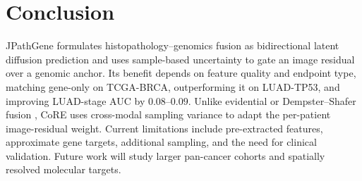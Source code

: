 \FloatBarrier
\section{Conclusion}
\label{sec:conclusion}

JPathGene formulates histopathology--genomics fusion as bidirectional latent
diffusion prediction and uses sample-based uncertainty to gate an image residual
over a genomic anchor. Its benefit depends on feature quality and endpoint type,
matching gene-only on TCGA-BRCA, outperforming it on LUAD-TP53, and improving
LUAD-stage AUC by $0.08$--$0.09$. Unlike evidential or Dempster--Shafer fusion
\cite{sensoy2018evidential,han2021trusted}, CoRE uses cross-modal sampling
variance to adapt the per-patient image-residual weight. Current limitations include pre-extracted features, approximate gene
targets, additional sampling, and the need for clinical validation. Future work
will study larger pan-cancer cohorts and spatially resolved molecular targets.
